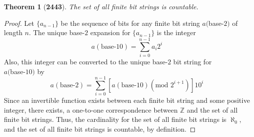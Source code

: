 \documentclass[preview]{standalone}
\newtheorem*{theorem*}{Theorem}
\begin{document}
\begin{theorem*}[\textbf{2443}]
    The set of all finite bit strings is countable.
\end{theorem*}

\begin{proof}
    Let $\{a_{n-1}\}$ be the sequence of bits for any finite bit string $a($base-$2)$ of length $n$. 
    The unique base-$2$ expansion for $\{a_{n-1}\}$ is the integer
    $$a(\text{base-}10) = \sum_{i = 0}^{n-1} a_{i}2^{i}$$
    Also, this integer can be converted to the unique base-$2$ bit string for \\ $a($base-$10)$ by 
    $$a(\text{base-}2) = 
    \sum_{i = 0}^{n-1}\left[a(\text{base-}10)(\text{mod } 2^{i+1})\right]10^{i}$$ 
    Since an invertible function exists between each finite bit string and some positive integer, 
    there exists, a one-to-one correspondence between $\mathbb{Z}$ and the set of all 
    finite bit strings. Thus, the cardinality for the set of all finite bit strings is $\aleph_0$,
    and the set of all finite bit strings is countable, by definition.
\color{lightgray} \end{proof}
\end{document}
